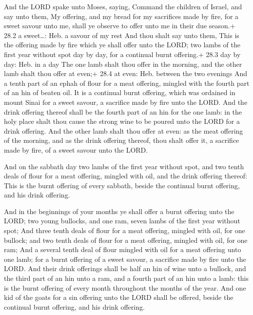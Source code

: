  And the LORD spake unto Moses, saying,  Command
the children of Israel, and say unto them, My offering, and my bread for
my sacrifices made by fire, for a sweet savour unto me, shall ye observe
to offer unto me in their due season.+ 28.2 a sweet\ldots: Heb. a savour
of my rest  And thou shalt say unto them, This is the
offering made by fire which ye shall offer unto the LORD; two lambs of
the first year without spot day by day, for a continual burnt offering.+
28.3 day by day: Heb. in a day  The one lamb shalt thou
offer in the morning, and the other lamb shalt thou offer at even;+ 28.4
at even: Heb. between the two evenings  And a tenth part of
an ephah of flour for a meat offering, mingled with the fourth part of
an hin of beaten oil.  It is a continual burnt offering,
which was ordained in mount Sinai for a sweet savour, a sacrifice made
by fire unto the LORD.  And the drink offering thereof shall
be the fourth part of an hin for the one lamb: in the holy place shalt
thou cause the strong wine to be poured unto the LORD for a drink
offering.  And the other lamb shalt thou offer at even: as
the meat offering of the morning, and as the drink offering thereof,
thou shalt offer it, a sacrifice made by fire, of a sweet savour unto
the LORD.

 And on the sabbath day two lambs of the first year
without spot, and two tenth deals of flour for a meat offering, mingled
with oil, and the drink offering thereof:  This is the
burnt offering of every sabbath, beside the continual burnt offering,
and his drink offering.

 And in the beginnings of your months ye shall offer a
burnt offering unto the LORD; two young bullocks, and one ram, seven
lambs of the first year without spot;  And three tenth
deals of flour for a meat offering, mingled with oil, for one bullock;
and two tenth deals of flour for a meat offering, mingled with oil, for
one ram;  And a several tenth deal of flour mingled with
oil for a meat offering unto one lamb; for a burnt offering of a sweet
savour, a sacrifice made by fire unto the LORD.  And their
drink offerings shall be half an hin of wine unto a bullock, and the
third part of an hin unto a ram, and a fourth part of an hin unto a
lamb: this is the burnt offering of every month throughout the months of
the year.  And one kid of the goats for a sin offering unto
the LORD shall be offered, beside the continual burnt offering, and his
drink offering.

